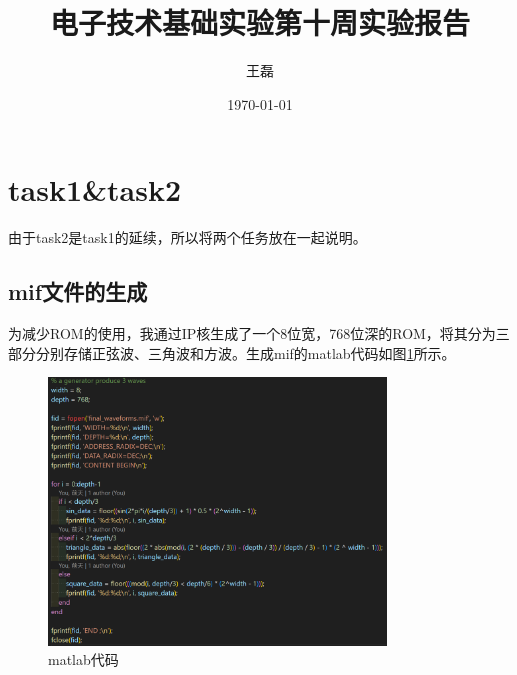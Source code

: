 \documentclass[UTF8]{ctexart}
\title{电子技术基础实验第十周实验报告}
\author{王磊\quad2022012972}
\date{\today}
\begin{document}
\maketitle
\section{task1\&task2}
由于task2是task1的延续，所以将两个任务放在一起说明。
\subsection{mif文件的生成}
为减少ROM的使用，我通过IP核生成了一个8位宽，768位深的ROM，将其分为三部分分别存储正弦波、三角波和方波。生成mif的matlab代码如图\ref{fig:matlab}所示。
\begin{figure}[!ht]
    \centering
    \includegraphics[width=0.8\textwidth]{matlab.png}
    \caption{matlab代码}
    \label{fig:matlab}
\end{figure}
\end{document}
